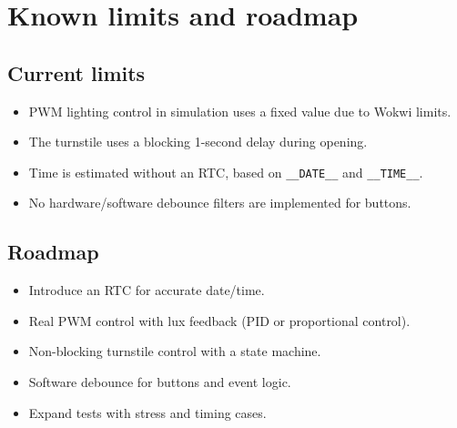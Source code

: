 \chapter{Known limits and roadmap}

\section{Current limits}
\begin{itemize}
  \item PWM lighting control in simulation uses a fixed value due to Wokwi limits.
  \item The turnstile uses a blocking 1-second delay during opening.
  \item Time is estimated without an RTC, based on \texttt{\_\_DATE\_\_} and \texttt{\_\_TIME\_\_}.
  \item No hardware/software debounce filters are implemented for buttons.
\end{itemize}

\section{Roadmap}
\begin{itemize}
  \item Introduce an RTC for accurate date/time.
  \item Real PWM control with lux feedback (PID or proportional control).
  \item Non-blocking turnstile control with a state machine.
  \item Software debounce for buttons and event logic.
  \item Expand tests with stress and timing cases.
\end{itemize}
